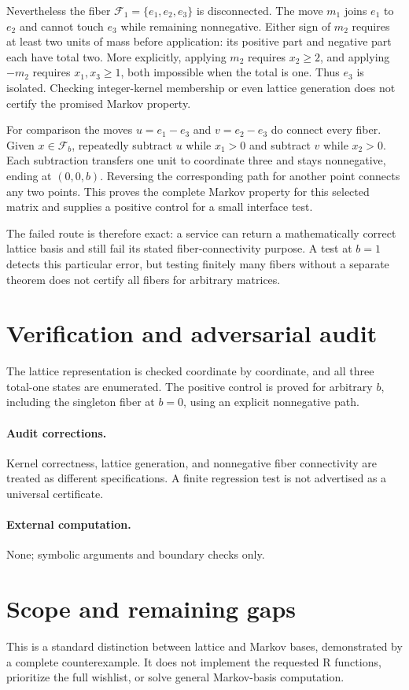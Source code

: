 \documentclass[11pt]{article}
\begin{document}
Nevertheless the fiber $\mathcal F_1=\{e_1,e_2,e_3\}$ is disconnected. The move $m_1$ joins $e_1$ to $e_2$ and cannot touch $e_3$ while remaining nonnegative. Either sign of $m_2$ requires at least two units of mass before application: its positive part and negative part each have total two. More explicitly, applying $m_2$ requires $x_2\ge2$, and applying $-m_2$ requires $x_1,x_3\ge1$, both impossible when the total is one. Thus $e_3$ is isolated. Checking integer-kernel membership or even lattice generation does not certify the promised Markov property.

For comparison the moves $u=e_1-e_3$ and $v=e_2-e_3$ do connect every fiber. Given $x\in\mathcal F_b$, repeatedly subtract $u$ while $x_1>0$ and subtract $v$ while $x_2>0$. Each subtraction transfers one unit to coordinate three and stays nonnegative, ending at $(0,0,b)$. Reversing the corresponding path for another point connects any two points. This proves the complete Markov property for this selected matrix and supplies a positive control for a small interface test.

The failed route is therefore exact: a service can return a mathematically correct lattice basis and still fail its stated fiber-connectivity purpose. A test at $b=1$ detects this particular error, but testing finitely many fibers without a separate theorem does not certify all fibers for arbitrary matrices.
\section{Verification and adversarial audit}
The lattice representation is checked coordinate by coordinate, and all three total-one states are enumerated. The positive control is proved for arbitrary $b$, including the singleton fiber at $b=0$, using an explicit nonnegative path.
\paragraph{Audit corrections.} Kernel correctness, lattice generation, and nonnegative fiber connectivity are treated as different specifications. A finite regression test is not advertised as a universal certificate.
\paragraph{External computation.} None; symbolic arguments and boundary checks only.
\section{Scope and remaining gaps}
This is a standard distinction between lattice and Markov bases, demonstrated by a complete counterexample. It does not implement the requested R functions, prioritize the full wishlist, or solve general Markov-basis computation.
\end{document}
